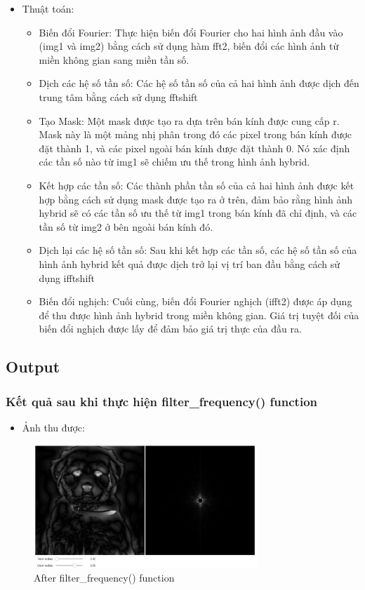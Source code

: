 \documentclass{article}
\begin{document}
\begin{itemize}
    
    \item Thuật toán:
    \begin{itemize}
        \item Biến đổi Fourier: Thực hiện biến đổi Fourier cho hai hình ảnh đầu vào (img1 và img2) bằng cách sử dụng hàm fft2, biến đổi các hình ảnh từ miền không gian sang miền tần số.
        \item Dịch các hệ số tần số: Các hệ số tần số của cả hai hình ảnh được dịch đến trung tâm bằng cách sử dụng fftshift
        \item Tạo Mask: Một mask được tạo ra dựa trên bán kính được cung cấp r. Mask này là một mảng nhị phân trong đó các pixel trong bán kính được đặt thành 1, và các pixel ngoài bán kính được đặt thành 0. Nó xác định các tần số nào từ img1 sẽ chiếm ưu thế trong hình ảnh hybrid.
        \item Kết hợp các tần số: Các thành phần tần số của cả hai hình ảnh được kết hợp bằng cách sử dụng mask được tạo ra ở trên, đảm bảo rằng hình ảnh hybrid sẽ có các tần số ưu thế từ img1 trong bán kính đã chỉ định, và các tần số từ img2 ở bên ngoài bán kính đó.
        \item Dịch lại các hệ số tần số: Sau khi kết hợp các tần số, các hệ số tần số của hình ảnh hybrid kết quả được dịch trở lại vị trí ban đầu bằng cách sử dụng ifftshift
        \item Biến đổi nghịch: Cuối cùng, biến đổi Fourier nghịch (ifft2) được áp dụng để thu được hình ảnh hybrid trong miền không gian. Giá trị tuyệt đối của biến đổi nghịch được lấy để đảm bảo giá trị thực của đầu ra.
    \end{itemize}
\end{itemize}



\subsection{Output}
\subsubsection{Kết quả sau khi thực hiện filter\_frequency() function}
\begin{itemize}
    \item Ảnh thu được:
\end{itemize}

\begin{figure}[H]
    \centering
    \includegraphics[width=0.75\textwidth]{ex23_output}
    \caption{After filter\_frequency() function}
    \label{ex23_output}
\end{figure}
\end{document}
